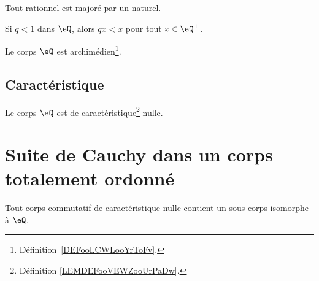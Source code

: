 \begin{lemma} \label{LEMooEBTIooGMoHsj}
	Tout rationnel est majoré par un naturel.
\end{lemma}


\begin{proposition}     \label{PROPooBTCCooVVvaeL}
	Si \( q<1\) dans \( \eQ\), alors \( qx<x\) pour tout \( x\in \eQ^+\).
\end{proposition}

\begin{proposition}     \label{PROPooMXGPooDUkOuv}
	Le corps \( \eQ\) est archimédien\footnote{Définition~\ref{DEFooLCWLooYrToFv}.}.
\end{proposition}

\subsection{Caractéristique}

\begin{lemma}       \label{LEMooYCPUooNxEPhB}
	Le corps \( \eQ\) est de caractéristique\footnote{Définition \ref{LEMDEFooVEWZooUrPaDw}.} nulle.
\end{lemma}

\section{Suite de Cauchy dans un corps totalement ordonné}


\begin{lemma}        \label{LEMooLTBIooSZnvsQ}
	Tout corps commutatif de caractéristique nulle contient un sous-corps isomorphe à \( \eQ\).
\end{lemma}

